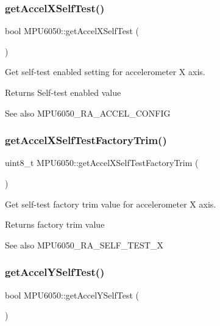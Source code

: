 \subsubsection{\texorpdfstring{getAccelXSelfTest()}{getAccelXSelfTest()}}
{\footnotesize\ttfamily bool M\+P\+U6050\+::get\+Accel\+X\+Self\+Test (\begin{DoxyParamCaption}{ }\end{DoxyParamCaption})}

Get self-\/test enabled setting for accelerometer X axis. \begin{DoxyReturn}{Returns}
Self-\/test enabled value 
\end{DoxyReturn}
\begin{DoxySeeAlso}{See also}
M\+P\+U6050\+\_\+\+R\+A\+\_\+\+A\+C\+C\+E\+L\+\_\+\+C\+O\+N\+F\+IG 
\end{DoxySeeAlso}
\mbox{\label{class_m_p_u6050_a0cfaa7fbf63fb5867e003d490eb3fd96}} 
\subsubsection{\texorpdfstring{getAccelXSelfTestFactoryTrim()}{getAccelXSelfTestFactoryTrim()}}
{\footnotesize\ttfamily uint8\+\_\+t M\+P\+U6050\+::get\+Accel\+X\+Self\+Test\+Factory\+Trim (\begin{DoxyParamCaption}{ }\end{DoxyParamCaption})}

Get self-\/test factory trim value for accelerometer X axis. \begin{DoxyReturn}{Returns}
factory trim value 
\end{DoxyReturn}
\begin{DoxySeeAlso}{See also}
M\+P\+U6050\+\_\+\+R\+A\+\_\+\+S\+E\+L\+F\+\_\+\+T\+E\+S\+T\+\_\+X 
\end{DoxySeeAlso}
\mbox{\label{class_m_p_u6050_a2523e798db3baf9cb9dbf347af16639b}} 
\subsubsection{\texorpdfstring{getAccelYSelfTest()}{getAccelYSelfTest()}}
{\footnotesize\ttfamily bool M\+P\+U6050\+::get\+Accel\+Y\+Self\+Test (\begin{DoxyParamCaption}{ }\end{DoxyParamCaption})}

